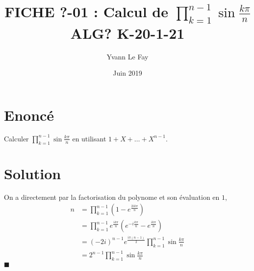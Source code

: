 \documentclass{article}
\newcommand*{\QED}{\hfill\ensuremath{\blacksquare}}%
\begin{document}
\title{FICHE ?-01 : Calcul de $\prod_{k=1}^{n-1}\sin{\frac{k\pi}{n}}$ ALG? K-20-1-21}
\author{Yvann Le Fay}
\date{Juin 2019}
\maketitle
\section*{Enoncé}
Calculer $\prod_{k=1}^{n-1}\sin{\frac{k\pi}{n}}$ en utilisant $1+X+\ldots+X^{n-1}$.
\section*{Solution}
On a directement par la factorisation du polynome et son évaluation en $1$,
\begin{align*}
n & = \prod_{k=1}^{n-1}(1-e^{\frac{2i k\pi}{n}})\\
&=\prod_{k=1}^{n-1}e^{\frac{i k\pi}{n}}(e^{-i\frac{k\pi}{n}}-e^{\frac{i k\pi}{n}})\\
&=(-2i)^{n-1}e^{\frac{i\pi(n-1)}{2}}\prod_{k=1}^{n-1}\sin{\frac{k\pi}{n}}\\
&=2^{n-1}\prod_{k=1}^{n-1}\sin{\frac{k\pi}{n}}
\end{align*}
\QED
\end{document}

